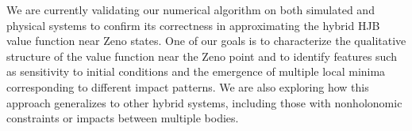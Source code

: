 \documentclass[letterpaper,11pt]{article}
\begin{document}
We are currently validating our numerical algorithm on both simulated and physical systems to confirm its correctness in approximating the hybrid HJB value function near Zeno states. 
One of our goals is to characterize the qualitative structure of the value function near the Zeno point and to identify features such as sensitivity to initial conditions and the emergence of multiple local minima corresponding to different impact patterns.
We are also exploring how this approach generalizes to other hybrid systems, including those with nonholonomic constraints or impacts between multiple bodies.




\printbibliography
\end{document}

